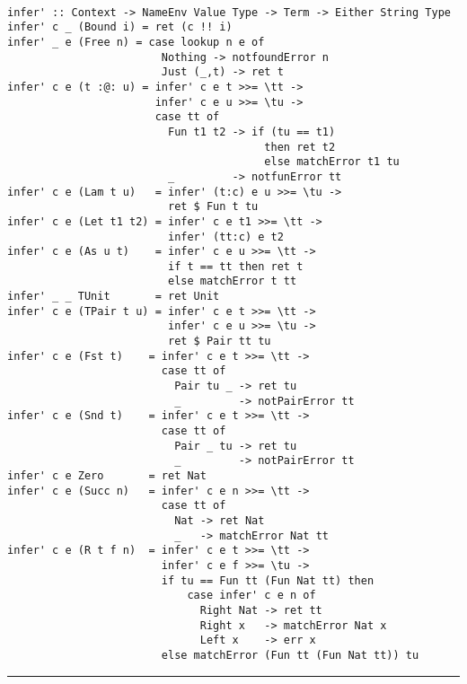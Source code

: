 \documentclass[a4paper]{report}
\begin{document}
\begin{lstlisting}

infer' :: Context -> NameEnv Value Type -> Term -> Either String Type
infer' c _ (Bound i) = ret (c !! i)
infer' _ e (Free n) = case lookup n e of
                        Nothing -> notfoundError n
                        Just (_,t) -> ret t
infer' c e (t :@: u) = infer' c e t >>= \tt ->
                       infer' c e u >>= \tu ->
                       case tt of
                         Fun t1 t2 -> if (tu == t1)
                                        then ret t2
                                        else matchError t1 tu
                         _         -> notfunError tt
infer' c e (Lam t u)   = infer' (t:c) e u >>= \tu ->
                         ret $ Fun t tu
infer' c e (Let t1 t2) = infer' c e t1 >>= \tt ->
                         infer' (tt:c) e t2
infer' c e (As u t)    = infer' c e u >>= \tt ->
                         if t == tt then ret t
                         else matchError t tt 
infer' _ _ TUnit       = ret Unit
infer' c e (TPair t u) = infer' c e t >>= \tt ->
                         infer' c e u >>= \tu ->
                         ret $ Pair tt tu
infer' c e (Fst t)    = infer' c e t >>= \tt ->
                        case tt of
                          Pair tu _ -> ret tu
                          _         -> notPairError tt
infer' c e (Snd t)    = infer' c e t >>= \tt ->
                        case tt of
                          Pair _ tu -> ret tu
                          _         -> notPairError tt
infer' c e Zero       = ret Nat
infer' c e (Succ n)   = infer' c e n >>= \tt ->
                        case tt of
                          Nat -> ret Nat
                          _   -> matchError Nat tt
infer' c e (R t f n)  = infer' c e t >>= \tt ->
                        infer' c e f >>= \tu ->
                        if tu == Fun tt (Fun Nat tt) then
                            case infer' c e n of
                              Right Nat -> ret tt
                              Right x   -> matchError Nat x
                              Left x    -> err x
                        else matchError (Fun tt (Fun Nat tt)) tu

\end{lstlisting}

\bigskip
\bigskip
\bigskip
\noindent\rule{16cm}{0.4pt}
\end{document}
